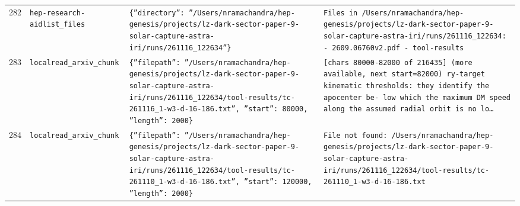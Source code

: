 \documentclass[11pt,a4paper]{article}
\begin{document}
\begin{longtable}{@{}p{}p{}p{}p{}@{}}
282 & \texttt{hep-research-aid}\newline\texttt{list\_\allowbreak{}files} & \texttt{\{''directory'':\allowbreak{} ''/\allowbreak{}Users/\allowbreak{}nramachandra/\allowbreak{}hep-genesis/\allowbreak{}projects/\allowbreak{}lz-dark-sector-paper-9-solar-capture-astra-iri/\allowbreak{}runs/\allowbreak{}261116\_\allowbreak{}122634''\}\allowbreak{}} & \texttt{Files in /\allowbreak{}Users/\allowbreak{}nramachandra/\allowbreak{}hep-genesis/\allowbreak{}projects/\allowbreak{}lz-dark-sector-paper-9-solar-capture-astra-iri/\allowbreak{}runs/\allowbreak{}261116\_\allowbreak{}122634:\allowbreak{}   - 2609.06760v2.pdf   - tool-results} \\
283 & \texttt{local}\newline\texttt{read\_\allowbreak{}arxiv\_\allowbreak{}chunk} & \texttt{\{''filepath'':\allowbreak{} ''/\allowbreak{}Users/\allowbreak{}nramachandra/\allowbreak{}hep-genesis/\allowbreak{}projects/\allowbreak{}lz-dark-sector-paper-9-solar-capture-astra-iri/\allowbreak{}runs/\allowbreak{}261116\_\allowbreak{}122634/\allowbreak{}tool-results/\allowbreak{}tc-261116\_\allowbreak{}1-w3-d-16-186.txt'',\allowbreak{} ''start'':\allowbreak{} 80000,\allowbreak{} ''length'':\allowbreak{} 2000\}\allowbreak{}} & \texttt{[chars 80000-82000 of 216435]\allowbreak{} (more available,\allowbreak{} next start=\allowbreak{}82000)\allowbreak{}  ry-target kinematic thresholds:\allowbreak{} they identify the apocenter be- low which the maximum DM speed along the assumed radial orbit is no lo\ldots{}\allowbreak{}} \\
284 & \texttt{local}\newline\texttt{read\_\allowbreak{}arxiv\_\allowbreak{}chunk} & \texttt{\{''filepath'':\allowbreak{} ''/\allowbreak{}Users/\allowbreak{}nramachandra/\allowbreak{}hep-genesis/\allowbreak{}projects/\allowbreak{}lz-dark-sector-paper-9-solar-capture-astra-iri/\allowbreak{}runs/\allowbreak{}261116\_\allowbreak{}122634/\allowbreak{}tool-results/\allowbreak{}tc-261110\_\allowbreak{}1-w3-d-16-186.txt'',\allowbreak{} ''start'':\allowbreak{} 120000,\allowbreak{} ''length'':\allowbreak{} 2000\}\allowbreak{}} & \texttt{File not found:\allowbreak{} /\allowbreak{}Users/\allowbreak{}nramachandra/\allowbreak{}hep-genesis/\allowbreak{}projects/\allowbreak{}lz-dark-sector-paper-9-solar-capture-astra-iri/\allowbreak{}runs/\allowbreak{}261116\_\allowbreak{}122634/\allowbreak{}tool-results/\allowbreak{}tc-261110\_\allowbreak{}1-w3-d-16-186.txt} \\

\end{longtable}
\end{document}
